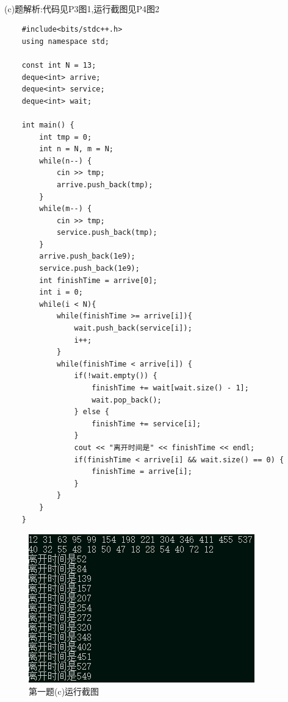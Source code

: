 \documentclass{book}
\begin{document}
\hspace*{\fill} \\
(c)题解析:代码见P3图1,运行截图见P4图2\\
\lstset{language = C++}
\begin{lstlisting}
    #include<bits/stdc++.h> 
    using namespace std;
    
    const int N = 13;
    deque<int> arrive;
    deque<int> service;
    deque<int> wait;
    
    int main() {
        int tmp = 0;
        int n = N, m = N;
        while(n--) {
            cin >> tmp;
            arrive.push_back(tmp);
        }
        while(m--) {
            cin >> tmp;
            service.push_back(tmp);
        }
        arrive.push_back(1e9);
        service.push_back(1e9);
        int finishTime = arrive[0];
        int i = 0;
        while(i < N){
            while(finishTime >= arrive[i]){
                wait.push_back(service[i]);
                i++;	
            } 
            while(finishTime < arrive[i]) {
                if(!wait.empty()) {
                    finishTime += wait[wait.size() - 1];
                    wait.pop_back();
                } else {
                    finishTime += service[i];
                }
                cout << "离开时间是" << finishTime << endl;
                if(finishTime < arrive[i] && wait.size() == 0) {
                    finishTime = arrive[i];
                }
            } 
        }
    }
\end{lstlisting}

\begin{figure}[H]
    \centering
    \includegraphics*[]{gramFile/1(c).png}
    \caption{第一题(c)运行截图}
\end{figure}

\hspace*{\fill} \\
\end{document}
